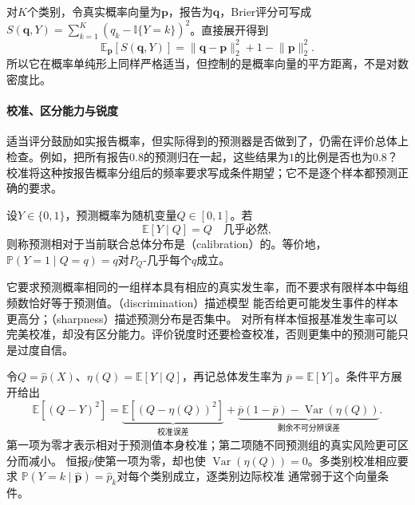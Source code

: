 对\(K\)个类别，令真实概率向量为\(\bm p\)，报告为\(\bm q\)，Brier评分可写成
\(S(\bm q,Y)=\sum_{k=1}^K(q_k-\mathbb{I}\{Y=k\})^2\)。直接展开得到
\[
  \mathbb{E}_{\bm p}[S(\bm q,Y)]
  =\lVert\bm q-\bm p\rVert_2^2
   +1-\lVert\bm p\rVert_2^2.
\]
所以它在概率单纯形上同样严格适当，但控制的是概率向量的平方距离，不是对数密度比。

\paragraph{校准、区分能力与锐度}
适当评分鼓励如实报告概率，但实际得到的预测器是否做到了，仍需在评价总体上检查。例如，把所有报告\(0.8\)的预测归在一起，这些结果为\(1\)的比例是否也为\(0.8\)？校准将这种按报告概率分组后的频率要求写成条件期望；它不是逐个样本都预测正确的要求。
\begin{definition}[二元概率校准]
  \label{def:statistics-probability-calibration}
  设\(Y\in\{0,1\}\)，预测概率为随机变量\(Q\in[0,1]\)。若
  \[ \mathbb E[Y\mid Q]=Q\quad\text{几乎必然}, \]
  则称预测相对于当前联合总体分布是（calibration）的。等价地，\(\mathbb P(Y=1\mid Q=q)=q\)对\(P_Q\)-几乎每个\(q\)成立。
\end{definition}
它要求预测概率相同的一组样本具有相应的真实发生率，而不要求有限样本中每组频数恰好等于预测值。（discrimination）描述模型
能否给更可能发生事件的样本更高分；（sharpness）描述预测分布是否集中。
对所有样本恒报基准发生率可以完美校准，却没有区分能力。评价锐度时还要检查校准，否则更集中的预测可能只是过度自信。

令\(Q=\widehat p(X)\)、\(\eta(Q)=\mathbb{E}[Y\mid Q]\)，再记总体发生率为
\(\overline p=\mathbb{E}[Y]\)。条件平方展开给出
\[
  \mathbb{E}[(Q-Y)^2]
  =
  \underbrace{\mathbb{E}[(Q-\eta(Q))^2]}_{\text{校准误差}}
  +\underbrace{\overline p(1-\overline p)
    -\operatorname{Var}(\eta(Q))}_{\text{剩余不可分辨误差}}.
\]
第一项为零才表示相对于预测值本身校准；第二项随不同预测组的真实风险更可区分而减小。
恒报\(\overline p\)使第一项为零，却也使
\(\operatorname{Var}(\eta(Q))=0\)。多类别校准相应要求
\(\mathbb{P}(Y=k\mid\widehat{\bm p})=\widehat p_k\)对每个类别成立，逐类别边际校准
通常弱于这个向量条件。

